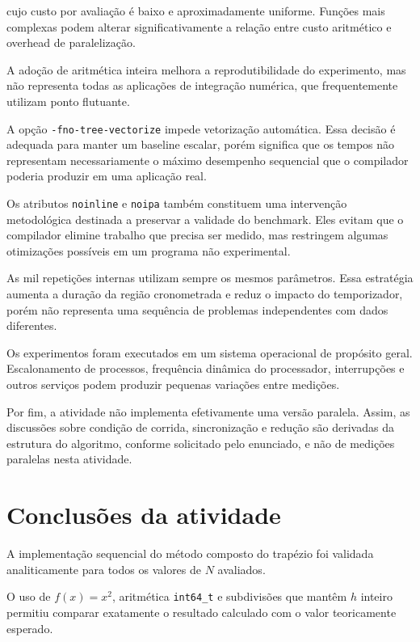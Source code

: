 cujo custo por avaliação é baixo e aproximadamente uniforme. Funções mais
complexas podem alterar significativamente a relação entre custo aritmético
e overhead de paralelização.

A adoção de aritmética inteira melhora a reprodutibilidade do experimento,
mas não representa todas as aplicações de integração numérica, que
frequentemente utilizam ponto flutuante.

A opção \texttt{-fno-tree-vectorize} impede vetorização automática. Essa
decisão é adequada para manter um baseline escalar, porém significa que os
tempos não representam necessariamente o máximo desempenho sequencial que
o compilador poderia produzir em uma aplicação real.

Os atributos \texttt{noinline} e \texttt{noipa} também constituem uma
intervenção metodológica destinada a preservar a validade do benchmark.
Eles evitam que o compilador elimine trabalho que precisa ser medido, mas
restringem algumas otimizações possíveis em um programa não experimental.

As mil repetições internas utilizam sempre os mesmos parâmetros. Essa
estratégia aumenta a duração da região cronometrada e reduz o impacto do
temporizador, porém não representa uma sequência de problemas independentes
com dados diferentes.

Os experimentos foram executados em um sistema operacional de propósito
geral. Escalonamento de processos, frequência dinâmica do processador,
interrupções e outros serviços podem produzir pequenas variações entre
medições.

Por fim, a atividade não implementa efetivamente uma versão paralela.
Assim, as discussões sobre condição de corrida, sincronização e redução são
derivadas da estrutura do algoritmo, conforme solicitado pelo enunciado,
e não de medições paralelas nesta atividade.


\section{Conclusões da atividade}

\label{sec:atvd04-conclusao}

A implementação sequencial do método composto do trapézio foi validada
analiticamente para todos os valores de \(N\) avaliados.

O uso de \(f(x)=x^2\), aritmética \texttt{int64\_t} e subdivisões que
mantêm \(h\) inteiro permitiu comparar exatamente o resultado calculado com
o valor teoricamente esperado.

